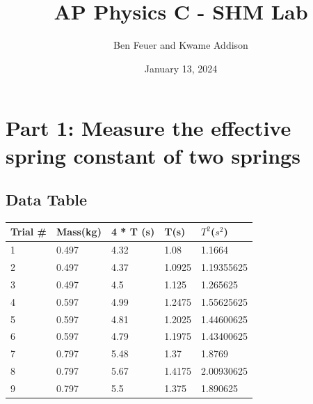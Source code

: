 \documentclass{report}
\title{\Huge{AP Physics C - SHM Lab}}
\author{\huge{Ben Feuer and Kwame Addison}}
\date{January 13, 2024}
\begin{document}
\maketitle
\newpage%
\pagebreak

\section*{Part 1: Measure the effective spring constant of two springs}

\subsection*{Data Table}
\begin{table}[h!]
\begin{tabular}{|l|l|l|l|l|}
\hline
\textbf{Trial \#} & \textbf{Mass(kg)} & \textbf{4 * T (s)} & \textbf{T(s)} & \textbf{$T^2$($s^2$)} \\ \hline
1                 & 0.497             & 4.32               & 1.08          & 1.1664                                              \\ \hline
2                 & 0.497             & 4.37               & 1.0925        & 1.19355625                                          \\ \hline
3                 & 0.497             & 4.5                & 1.125         & 1.265625                                            \\ \hline
4                 & 0.597             & 4.99               & 1.2475        & 1.55625625                                          \\ \hline
5                 & 0.597             & 4.81               & 1.2025        & 1.44600625                                          \\ \hline
6                 & 0.597             & 4.79               & 1.1975        & 1.43400625                                          \\ \hline
7                 & 0.797             & 5.48               & 1.37          & 1.8769                                              \\ \hline
8                 & 0.797             & 5.67               & 1.4175        & 2.00930625                                          \\ \hline
9                 & 0.797             & 5.5                & 1.375         & 1.890625                                            \\ \hline

\end{tabular}
\end{table}
\end{document}
